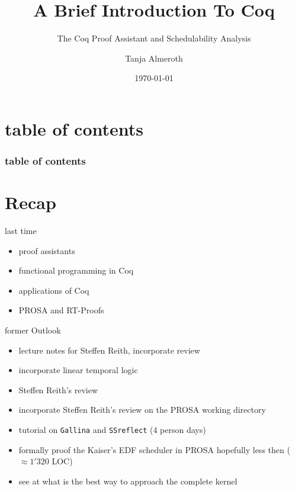 \documentclass{beamer}
\title{A Brief Introduction To Coq}
\subtitle{The Coq Proof Assistant and Schedulability Analysis}
\author{Tanja Almeroth}
\institute{Studienbereich DCSM\\Hochschule {\Medium RheinMain}}
\date{\today}
\begin{document}
	
	\maketitle
		
	\section*{table of contents}
	
		\begin{frame}
			\frametitle{table of contents}
			\tableofcontents[hideallsubsections]
		\end{frame}
	
	


	\section{Recap}
	
	\begin{frame}{last time}
		\begin{itemize}
			\item proof assistants
			\item functional programming in Coq
			\item applications of Coq
			\item PROSA	and RT-Proofs
		\end{itemize}
	\end{frame}


	\begin{frame}{former Outlook}
		 \begin{itemize}
		 	 \item lecture notes for Steffen Reith, incorporate  review
		 	 \item incorporate linear temporal logic
			  \item Steffen Reith's review 
			  \item incorporate Steffen Reith's review on the PROSA working directory
		      \item tutorial on \texttt{Gallina} and \texttt{SSreflect} (4 person days)
			   \item formally proof the Kaiser's EDF scheduler in PROSA hopefully less then ($\approx 1'320$ LOC)
			  \item see at what is the best way to approach the complete kernel
			  
			  \end{itemize}
	 \end{frame}
	 
\end{document}
